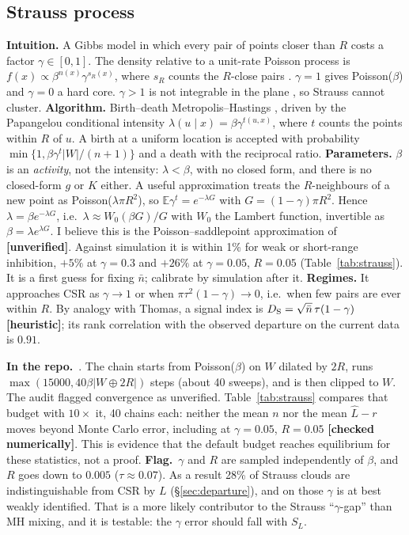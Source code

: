 \documentclass[10pt,a4paper]{article}
\newcommand{\code}[1]{\texttt{\detokenize{#1}}}
\newcommand{\repo}{\par\textbf{In the repo.}\ }
\newcommand{\flag}{\textcolor{red!65!black}{\textbf{Flag.}}\ }
\newcommand{\unver}{\textcolor{orange!85!black}{\textbf{[unverified]}}}
\newcommand{\checked}{\textcolor{green!45!black}{\textbf{[checked numerically]}}}
\newcommand{\heur}{\textcolor{orange!85!black}{\textbf{[heuristic]}}}
\newcommand{\E}{\mathbb{E}}
\newcommand{\nbar}{\bar n}
\begin{document}
\subsection{Strauss process}\label{sec:strauss}
\textbf{Intuition.} A Gibbs model in which every pair of points closer than $R$ costs a factor $\gamma\in[0,1]$. The density relative to a unit-rate Poisson process is $f(x)\propto\beta^{n(x)}\gamma^{s_R(x)}$, where $s_R$ counts the $R$-close pairs \citep{Strauss1975}. $\gamma=1$ gives Poisson($\beta$) and $\gamma=0$ a hard core. $\gamma>1$ is not integrable in the plane \citep{KellyRipley1976}, so Strauss cannot cluster.
\textbf{Algorithm.} Birth--death Metropolis--Hastings \citep{GeyerMoller1994}, driven by the Papangelou conditional intensity $\lambda(u\mid x)=\beta\gamma^{t(u,x)}$, where $t$ counts the points within $R$ of $u$. A birth at a uniform location is accepted with probability $\min\{1,\beta\gamma^{t}|W|/(n+1)\}$ and a death with the reciprocal ratio.
\textbf{Parameters.} $\beta$ is an \emph{activity}, not the intensity: $\lambda<\beta$, with no closed form, and there is no closed-form $g$ or $K$ either. A useful approximation treats the $R$-neighbours of a new point as Poisson($\lambda\pi R^2$), so $\E\gamma^t=e^{-\lambda G}$ with $G=(1-\gamma)\pi R^2$. Hence $\lambda=\beta e^{-\lambda G}$, i.e.\ $\lambda\approx W_0(\beta G)/G$ with $W_0$ the Lambert function, invertible as $\beta=\lambda e^{\lambda G}$. I believe this is the Poisson--saddlepoint approximation of \citet{BaddeleyNair2012} \unver{}. Against simulation it is within 1\% for weak or short-range inhibition, $+5\%$ at $\gamma=0.3$ and $+26\%$ at $\gamma=0.05$, $R=0.05$ (Table~\ref{tab:strauss}). It is a first guess for fixing $\nbar$; calibrate by simulation after it.
\textbf{Regimes.} It approaches CSR as $\gamma\to1$ or when $\pi\tau^2(1-\gamma)\to0$, i.e.\ when few pairs are ever within $R$. By analogy with Thomas, a signal index is $D_{\rm S}=\sqrt{\nbar}\,\tau(1-\gamma)$ \heur{}; its rank correlation with the observed departure on the current data is $0.91$.
\repo \code{gibbs.py:28-100,140-152}. The chain starts from Poisson($\beta$) on $W$ dilated by $2R$, runs $\max(15000,40\beta|W\oplus2R|)$ steps (about 40 sweeps), and is then clipped to $W$. The audit flagged convergence as unverified. Table~\ref{tab:strauss} compares that budget with $10\times$ it, 40 chains each: neither the mean $n$ nor the mean $\hat L-r$ moves beyond Monte Carlo error, including at $\gamma=0.05$, $R=0.05$ \checked{}. This is evidence that the default budget reaches equilibrium for these statistics, not a proof. \flag $\gamma$ and $R$ are sampled independently of $\beta$, and $R$ goes down to $0.005$ ($\tau\approx0.07$). As a result 28\% of Strauss clouds are indistinguishable from CSR by $L$ (\S\ref{sec:departure}), and on those $\gamma$ is at best weakly identified. That is a more likely contributor to the Strauss ``$\gamma$-gap'' than MH mixing, and it is testable: the $\gamma$ error should fall with $S_L$.
\end{document}
